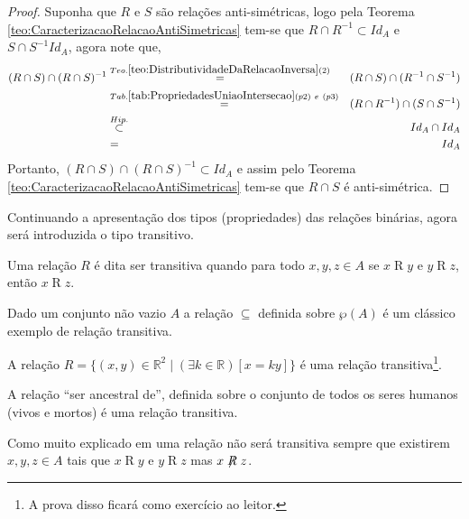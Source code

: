 \begin{proof}
	Suponha que $R$ e $S$ são relações anti-simétricas, logo pela Teorema \ref{teo:CaracterizacaoRelacaoAntiSimetricas} tem-se que $R \cap R^{-1} \subset Id_A$ e $S \cap S^{-1} Id_A$, agora note que,
	\begin{eqnarray*}
		(R \cap S) \cap (R \cap S)^{-1} & \stackrel{Teo. \ref{teo:DistributividadeDaRelacaoInversa}(2)}{=} & (R \cap S) \cap (R^{-1} \cap S^{-1})\\
		& \stackrel{Tab. \ref{tab:PropriedadesUniaoIntersecao}(p2) \ e \ (p3)}{=} & (R \cap R^{-1}) \cap (S \cap S^{-1})\\
		& \stackrel{Hip.}{\subset} & Id_A \cap Id_A\\
		& = & Id_A
	\end{eqnarray*}
	Portanto, $(R \cap S) \cap (R \cap S)^{-1} \subset Id_A$ e assim pelo Teorema \ref{teo:CaracterizacaoRelacaoAntiSimetricas} tem-se que $R \cap S$ é anti-simétrica.
\end{proof}

Continuando a apresentação dos tipos (propriedades) das relações binárias, agora será introduzida o tipo transitivo.

\begin{definicao}\label{def:RelacaoTransitiva}
	Uma relação $R$ é dita ser transitiva quando para todo $x, y, z \in A$ se $x \mathrel{R} y$ e $y \mathrel{R} z$, então $x \mathrel{R} z$.
\end{definicao}

\begin{exemplo}
	Dado um conjunto não vazio $A$ a relação $\subseteq$ definida sobre $\wp(A)$ é um clássico exemplo de relação transitiva.
\end{exemplo}

\begin{exemplo}
	A relação $R = \{(x, y) \in \mathbb{R}^2 \mid (\exists k \in \mathbb{R})[x = ky]\}$ é uma relação transitiva\footnote{A prova disso ficará como exercício ao leitor.}.
\end{exemplo}

\begin{exemplo}
	A relação ``ser ancestral de'', definida sobre o conjunto de todos os seres humanos (vivos e mortos) é uma relação transitiva.
\end{exemplo}

Como muito explicado em \cite{abe1991-TC} uma relação não será transitiva sempre que existirem $x, y, z \in A$ tais que  $x \mathrel{R} y$ e $y \mathrel{R} z$ mas $x \centernot{R} z$.

